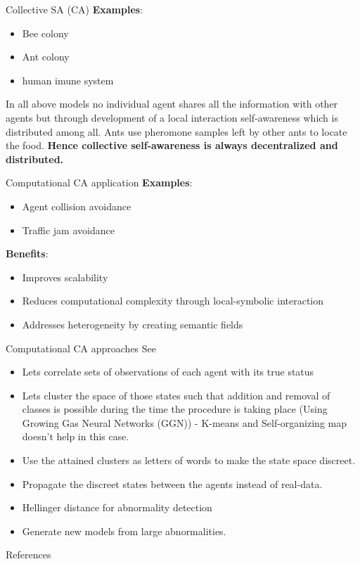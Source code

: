 \documentclass[handout]{beamer}
\begin{document}
\begin{frame}{Collective SA (CA)}
	\textbf{Examples}:
	\begin{itemize}
		\item Bee colony
		\item Ant colony
		\item human imune system
	\end{itemize}
	In all above models no individual agent shares all the information with other agents but through development of a local interaction self-awareness which is distributed among all. Ants use pheromone samples left by other ants to locate the food. \textbf{Hence collective self-awareness is always decentralized and distributed.}  \cite{mitchell-2005-self-awareness-and-control-in-decentralized-systems}
\end{frame}

\begin{frame}{Computational CA application}
	\textbf{Examples}:
	\begin{itemize}
		\item Agent collision avoidance
		\item Traffic jam avoidance
	\end{itemize}
	\textbf{Benefits}:
	\begin{itemize}
		\item Improves scalability
		\item Reduces computational complexity through local-symbolic interaction
		\item Addresses heterogeneity by creating semantic fields
	\end{itemize}
\end{frame}

\begin{frame}{Computational CA approaches}
	See \cite{regazzoni-2020-multi-sensorial-generative-and-descriptive-self-awareness-models-for-autonomous-systems,kanapram-2020-collective-awareness-for-abnormality-detection-in-connected-autonomous-vehicles,kanapram-2019-self-awareness-in-intelligent-vehicles-experience-based-abnormality-detection}
	\begin{itemize}
		\item Lets correlate sets of observations of each agent with its true status
		\item Lets cluster the space of those states such that addition and removal of classes is possible during the time the procedure is taking place (Using Growing Gas Neural Networks (GGN)) - K-means and Self-organizing map doesn't help in this case.
		\item Use the attained clusters as letters of words to make the state space discreet.  
		\item Propagate the discreet states between the agents instead of real-data.
		\item Hellinger distance for abnormality detection
		\item Generate new models from large abnormalities.
	\end{itemize}
\end{frame}

\begin{frame}{References}
	\printbibliography
\end{frame}
\end{document}
